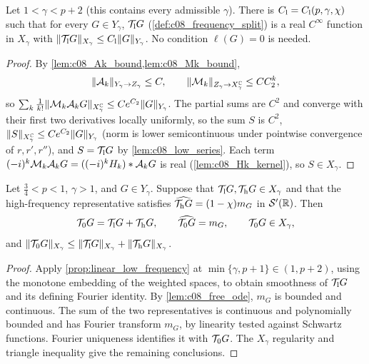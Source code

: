 \begin{proposition}
  \label{prop:linear_low_frequency}
  Let $1<\gamma<p+2$ (this contains every admissible $\gamma$). There is $C_{\rm l}=C_{\rm l}(p,\gamma,\chi)$ such that for every
  $G\in Y_\gamma$, $\mathcal{T}_{\rm l}G$ (\cref{def:c08_frequency_split}) is a real $C^\infty$ function in $X_\gamma$ with
  $\|\mathcal{T}_{\rm l}G\|_{X_\gamma}\le C_{\rm l}\|G\|_{Y_\gamma}$. No condition $\ell(G)=0$ is needed.
\end{proposition}
\begin{proof}
  By \cref{lem:c08_Ak_bound,lem:c08_Mk_bound},
  \begin{equation}\label{eqn:linear_low_frequency_factor_bounds}
    \|\mathcal{A}_k\|_{Y_\gamma\to Z_\gamma}\le C,\qquad\|\mathcal{M}_k\|_{Z_\gamma\to X^{\mathbb{C}}_\gamma}\le CC_2^k,
  \end{equation}
  so $\sum_k\frac1{k!}\|\mathcal{M}_k\mathcal{A}_kG\|_{X^{\mathbb{C}}_\gamma}\le C e^{C_2}\|G\|_{Y_\gamma}$. The partial sums are $C^2$ and converge with their first two
  derivatives locally uniformly, so the sum $S$ is $C^2$, $\|S\|_{X^{\mathbb{C}}_\gamma}\le Ce^{C_2}\|G\|_{Y_\gamma}$ (norm is lower semicontinuous under
  pointwise convergence of $r,r',r''$), and $S=\mathcal{T}_{\rm l}G$ by \cref{lem:c08_low_series}. Each term
  $(-i)^k\mathcal{M}_k\mathcal{A}_kG=((-i)^kH_k)*\mathcal{A}_kG$ is real (\cref{lem:c08_Hk_kernel}), so $S\in X_\gamma$.
\end{proof}

\begin{lemma}
  \label{lem:c08_frequency_split_sum}
  Let $\frac34<p<1$, $\gamma>1$, and $G\in Y_\gamma$. Suppose that
  $\mathcal{T}_{\rm l}G,\mathcal{T}_{\rm h}G\in X_\gamma$ and that the high-frequency representative satisfies
  $\widehat{\mathcal{T}_{\rm h}G}=(1-\chi)m_G$ in $\mathcal S'(\mathbb{R})$. Then
  \[
    \mathcal{T}_0G=\mathcal{T}_{\rm l}G+\mathcal{T}_{\rm h}G,\qquad
    \widehat{\mathcal{T}_0G}=m_G,\qquad \mathcal{T}_0G\in X_\gamma,
  \]
  and $\|\mathcal{T}_0G\|_{X_\gamma}\le
  \|\mathcal{T}_{\rm l}G\|_{X_\gamma}+\|\mathcal{T}_{\rm h}G\|_{X_\gamma}$.
\end{lemma}
\begin{proof}
  Apply \cref{prop:linear_low_frequency} at $\min\{\gamma,p+1\}\in(1,p+2)$, using the monotone
  embedding of the weighted spaces, to obtain smoothness of $\mathcal{T}_{\rm l}G$ and its defining Fourier
  identity. By \cref{lem:c08_free_ode}, $m_G$ is bounded and continuous. The sum of the two
  representatives is continuous and polynomially bounded and has Fourier transform $m_G$, by
  linearity tested against Schwartz functions. Fourier uniqueness identifies it with $\mathcal{T}_0G$.
  The $X_\gamma$ regularity and triangle inequality give the remaining conclusions.
\end{proof}

